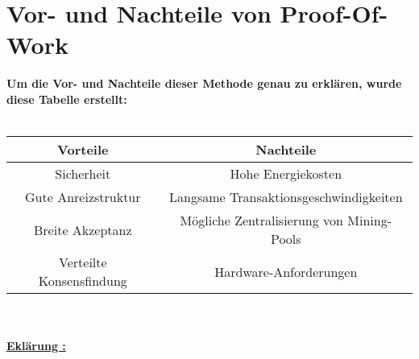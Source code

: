 \documentclass[ngerman]{scrreprt}
\begin{document}
\section{Vor- und Nachteile von Proof-Of-Work}
\textbf{Um die Vor- und Nachteile dieser Methode genau zu erklären, wurde diese Tabelle erstellt: \cite{fool} } \\ \\
\begin{tabular}{|c|c|}
	\hline
	\textbf{Vorteile} & \textbf{Nachteile} \\ \hline
	Sicherheit & Hohe Energiekosten \\ \hline
	Gute Anreizstruktur & Langsame Transaktionsgeschwindigkeiten \\ \hline
	Breite Akzeptanz & Mögliche Zentralisierung von Mining-Pools \\ \hline
	Verteilte Konsensfindung & Hardware-Anforderungen \\ \hline
\end{tabular}\\ \\
\textbf{\underline{Eklärung :}}
\end{document}
